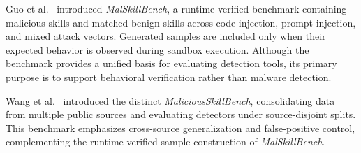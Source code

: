 Guo et al.~\cite{guo2026malskillbench} introduced \textit{MalSkillBench}, a runtime-verified benchmark containing malicious skills and matched benign skills across code-injection, prompt-injection, and mixed attack vectors. Generated samples are included only when their expected behavior is observed during sandbox execution. Although the benchmark provides a unified basis for evaluating detection tools, its primary purpose is to support behavioral verification rather than malware detection.

Wang et al.~\cite{wang2026maliciousskillbench} introduced the distinct \textit{MaliciousSkillBench}, consolidating data from multiple public sources and evaluating detectors under source-disjoint splits. This benchmark emphasizes cross-source generalization and false-positive control, complementing the runtime-verified sample construction of \textit{MalSkillBench}.




